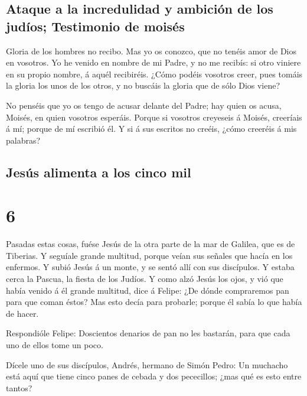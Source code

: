\hypertarget{ataque-a-la-incredulidad-y-ambiciuxf3n-de-los-juduxedos-testimonio-de-moisuxe9s}{%
\subsection{Ataque a la incredulidad y ambición de los judíos;
Testimonio de
moisés}\label{ataque-a-la-incredulidad-y-ambiciuxf3n-de-los-juduxedos-testimonio-de-moisuxe9s}}

 Gloria de los hombres no recibo.  Mas yo os
conozco, que no tenéis amor de Dios en vosotros.  Yo he
venido en nombre de mi Padre, y no me recibís: si otro viniere en su
propio nombre, á aquél recibiréis.  ¿Cómo podéis vosotros
creer, pues tomáis la gloria los unos de los otros, y no buscáis la
gloria que de sólo Dios viene?

 No penséis que yo os tengo de acusar delante del Padre;
hay quien os acusa, Moisés, en quien vosotros esperáis. 
Porque si vosotros creyeseis á Moisés, creeríais á mí; porque de mí
escribió él.  Y si á sus escritos no creéis, ¿cómo creeréis
á mis palabras?

\hypertarget{jesuxfas-alimenta-a-los-cinco-mil}{%
\subsection{Jesús alimenta a los cinco
mil}\label{jesuxfas-alimenta-a-los-cinco-mil}}

\hypertarget{section-5}{%
\section{6}\label{section-5}}

 Pasadas estas cosas, fuése Jesús de la otra parte de la mar
de Galilea, que es de Tiberias.  Y seguíale grande multitud,
porque veían sus señales que hacía en los enfermos.  Y subió
Jesús á un monte, y se sentó allí con sus discípulos.  Y
estaba cerca la Pascua, la fiesta de los Judíos.  Y como
alzó Jesús los ojos, y vió que había venido á él grande multitud, dice á
Felipe: ¿De dónde compraremos pan para que coman éstos?  Mas
esto decía para probarle; porque él sabía lo que había de hacer.

 Respondióle Felipe: Doscientos denarios de pan no les
bastarán, para que cada uno de ellos tome un poco.

 Dícele uno de sus discípulos, Andrés, hermano de Simón
Pedro:  Un muchacho está aquí que tiene cinco panes de
cebada y dos pececillos; ¿mas qué es esto entre tantos?

